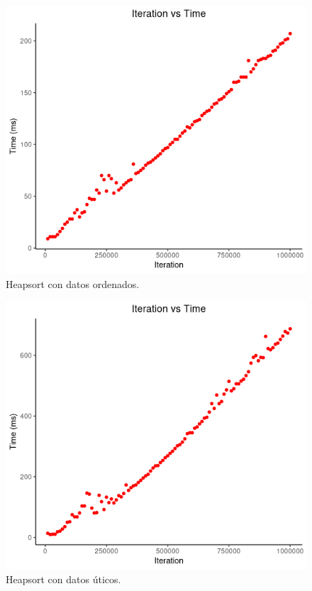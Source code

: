 \documentclass[paper=a4, fontsize=11pt]{scrartcl} %
\numberwithin{equation}{section} %
\numberwithin{figure}{section} %
\numberwithin{table}{section} %
\begin{document}
\begin{figure}
    \includegraphics[width=\linewidth]{heap_ordered.png}
    \caption{Heapsort con datos ordenados.}
\end{figure}

\begin{figure}
    \includegraphics[width=\linewidth]{heap_unique.png}
    \caption{Heapsort con datos úticos.}
\end{figure}
\end{document}

